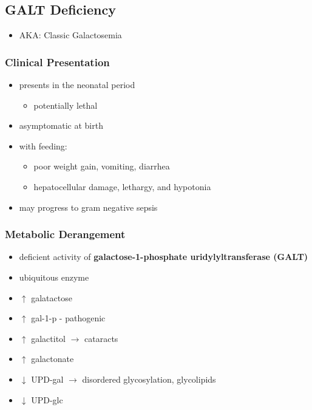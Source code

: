\documentclass[12pt]{scrartcl}
\begin{document}
\subsection{GALT Deficiency}
\label{sec:orgcbbc7a9}
\begin{itemize}
\item AKA: Classic Galactosemia
\end{itemize}
\subsubsection{Clinical Presentation}
\label{sec:orgc8a6f33}
\begin{itemize}
\item presents in the neonatal period
\begin{itemize}
\item potentially lethal
\end{itemize}
\item asymptomatic at birth
\item with feeding:
\begin{itemize}
\item poor weight gain, vomiting, diarrhea
\item hepatocellular damage, lethargy, and hypotonia
\end{itemize}
\item may progress to gram negative sepsis
\end{itemize}

\subsubsection{Metabolic Derangement}
\label{sec:org0e3c5d8}
\begin{itemize}
\item deficient activity of \textbf{galactose-1-phosphate uridylyltransferase (GALT)}
\item ubiquitous enzyme
\item \(\uparrow\)  galatactose
\item \(\uparrow\) gal-1-p - pathogenic
\item \(\uparrow\) galactitol \(\to\) cataracts
\item \(\uparrow\) galactonate
\item \(\downarrow\) UPD-gal \(\to\) disordered glycosylation, glycolipids
\item \(\downarrow\) UPD-glc
\end{itemize}
\end{document}

